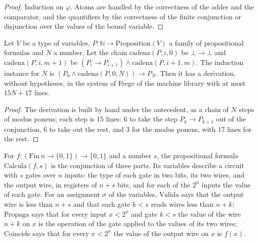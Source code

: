 \begin{proof}
  \leanok
  Induction on $\varphi$. Atoms are handled by the correctness of the adder and the comparator, and the
  quantifiers by the correctness of the finite conjunction or disjunction over the values of the
  bound variable.
\end{proof}

\begin{theorem}
  \label{thm:arithmetic-induction-frege}
  \leanok
  Let $V$ be a type of variables, $P : \mathbb{N} \to \mathrm{Proposition}(V)$ a family of
  propositional formulas and $N$ a number. Let the chain $\mathrm{cadena}(P, i, 0)$ be $\bot \to
  \bot$ and $\mathrm{cadena}(P, i, m + 1)$ be $(P_i \to P_{i+1}) \wedge \mathrm{cadena}(P, i + 1,
  m)$. The induction instance for $N$ is $(P_0 \wedge \mathrm{cadena}(P, 0, N)) \to P_N$. Then it has
  a derivation, without hypotheses, in the system of Frege of the machine library with at most $15N +
  17$ lines.
\end{theorem}

\begin{proof}
  \leanok
  The derivation is built by hand under the antecedent, as a chain of $N$ steps of modus ponens; each
  step is $15$ lines: $6$ to take the step $P_k \to P_{k+1}$ out of the conjunction, $6$ to take out
  the rest, and $3$ for the modus ponens, with $17$ lines for the rest.
\end{proof}

\begin{definition}
  \label{def:arithmetic-calcula}
  \leanok
  \own{}
  \infrastructure{}
  For $f : (\mathrm{Fin}\ n \to \{0,1\}) \to \{0,1\}$ and a number $s$, the propositional formula
  $\mathrm{Calcula}(f, s)$ is the conjunction of three parts. Its variables describe a circuit with
  $s$ gates over $n$ inputs: the type of each gate in two bits, its two wires, and the output wire,
  in registers of $n + s$ bits, and for each of the $2^n$ inputs the value of each gate. For an
  assignment $\sigma$ of the variables, $\mathrm{Valida}$ says that the output wire is less than $n +
  s$ and that each gate $k < s$ reads wires less than $n + k$; $\mathrm{Propaga}$ says that for every
  input $x < 2^n$ and gate $k < s$ the value of the wire $n + k$ on $x$ is the operation of the gate
  applied to the values of its two wires; $\mathrm{Coincide}$ says that for every $x < 2^n$ the value
  of the output wire on $x$ is $f(x)$.
\end{definition}

